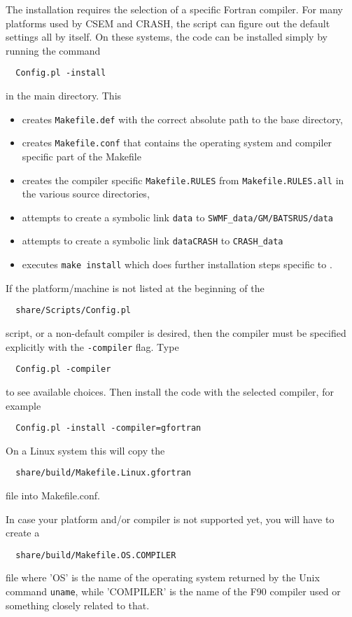The installation requires the selection of a specific Fortran compiler. 
For many platforms used by CSEM and CRASH, the script can figure out 
the default settings all by itself. 
On these systems, the code can be installed simply by running the command
\begin{verbatim}
  Config.pl -install
\end{verbatim}
in the main directory. This
\begin{itemize}
\item creates {\tt Makefile.def} with the correct 
      absolute path to the base directory, 
\item creates {\tt Makefile.conf} that contains the operating 
      system and compiler specific part of the Makefile
\item creates the compiler specific {\tt Makefile.RULES} from
      {\tt Makefile.RULES.all} in the various source directories,
\item attempts to create a symbolic link {\tt data} to {\tt SWMF\_data/GM/BATSRUS/data}
\item attempts to create a symbolic link {\tt dataCRASH} to {\tt CRASH\_data}
\item executes {\tt make install} which does further
      installation steps specific to \BATSRUS. 
\end{itemize}
If the platform/machine is not listed at the beginning of the
\begin{verbatim}
  share/Scripts/Config.pl
\end{verbatim}
script, or a non-default compiler is desired, then the compiler 
must be specified explicitly with the {\tt -compiler} flag. Type 
\begin{verbatim}
  Config.pl -compiler
\end{verbatim}
to see available choices. Then install the code with the selected compiler,
for example 
\begin{verbatim}
  Config.pl -install -compiler=gfortran
\end{verbatim}
On a Linux system this will copy the
\begin{verbatim}
  share/build/Makefile.Linux.gfortran
\end{verbatim}
file into Makefile.conf. 

In case your platform and/or compiler is not supported yet, 
you will have to create a
\begin{verbatim}
  share/build/Makefile.OS.COMPILER
\end{verbatim}
file where 'OS' is the name of the operating system returned
by the Unix command {\tt uname}, while 'COMPILER' is the name
of the F90 compiler used or something closely related to that.

